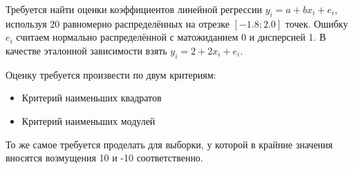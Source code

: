 \item Требуется найти оценки коэффициентов линейной регрессии $y_i = a + bx_i + e_i$, используя 20 равномерно распределённых на отрезке $[-1.8; 2.0]$ точек. Ошибку $e_i$ считаем нормально распределённой с матожиданием 0 и дисперсией 1. В качестве эталонной зависимости взять $y_i = 2 + 2x_i + e_i$.

Оценку требуется произвести по двум критериям:
\begin{itemize}
	\item Критерий наименьших квадратов
	\item Критерий наименьших модулей
\end{itemize}

То же самое требуется проделать для выборки, у которой в крайние значения вносятся возмущения 10 и -10 соответственно.